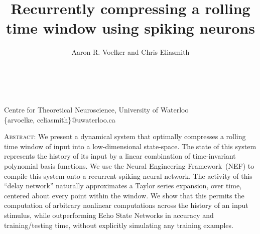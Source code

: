 \documentclass[12pt, a4paper]{article}
\title{Recurrently compressing a rolling time window %
using spiking neurons}
\author{Aaron R. Voelker and Chris Eliasmith}
\makeatletter
\newcommand{\thetitle}{\@title}
\newcommand{\theauthor}{\@author}
\newcommand{\theaffiliation}{
	Centre for Theoretical Neuroscience, University of Waterloo\\
	\{arvoelke, celiasmith\}@uwaterloo.ca}
\makeatother
\begin{document}
{\centering
 \Large\thetitle\\[0.25cm]
 \large\theauthor\\[0.25cm]
 \normalsize\theaffiliation\\[0.5cm]}

\noindent
\textsc{Abstract:} We present a dynamical system that optimally compresses a rolling time window of input into a low-dimensional state-space.
The state of this system represents the history of its input by a linear combination of time-invariant polynomial basis functions.
We use the Neural Engineering Framework~(NEF) to compile this system onto a recurrent spiking neural network.
The activity of this ``delay network'' naturally approximates a Taylor series expansion, over time, centered about every point within the window.
We show that this permits the computation of arbitrary nonlinear computations across the history of an input stimulus, while outperforming Echo State Networks in accuracy and training/testing time, without explicitly simulating any training examples. \\
\end{document}
